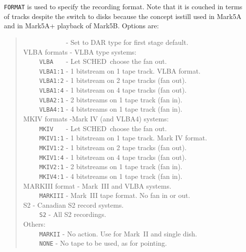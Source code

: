 \documentclass{report}
\newcommand{\schedb}{{\sc SCHED~}}
\begin{document}
{\tt FORMAT} is used to specify the recording format. Note that it is couched
in terms of tracks despite the switch to disks because the concept isstill
used in Mark5A and in Mark5A+ playback of Mark5B.  Options are:
\begin{verse}

\noindent ~~~~ {\tt ~~~~~~~} - Set to DAR type for first stage default.\\
\noindent VLBA formats - VLBA type systems:  \\
\noindent ~~~~ {\tt VLBA~~~} - Let \schedb choose the fan out. \\
\noindent ~~~~ {\tt VLBA1:1} - 1 bitstream on 1 tape track. VLBA format.  \\
\noindent ~~~~ {\tt VLBA1:2} - 1 bitstream on 2 tape tracks (fan out).    \\
\noindent ~~~~ {\tt VLBA1:4} - 1 bitstream on 4 tape tracks (fan out).    \\
\noindent ~~~~ {\tt VLBA2:1} - 2 bitstreams on 1 tape track (fan in).     \\
\noindent ~~~~ {\tt VLBA4:1} - 4 bitstreams on 1 tape track (fan in).     \\
\noindent MKIV formats -Mark IV (and VLBA4) systems:  \\
\noindent ~~~~ {\tt MKIV~~~} - Let \schedb choose the fan out. \\
\noindent ~~~~ {\tt MKIV1:1} - 1 bitstream on 1 tape track. Mark IV format.  \\
\noindent ~~~~ {\tt MKIV1:2} - 1 bitstream on 2 tape tracks (fan out).    \\
\noindent ~~~~ {\tt MKIV1:4} - 1 bitstream on 4 tape tracks (fan out).    \\
\noindent ~~~~ {\tt MKIV2:1} - 2 bitstreams on 1 tape track (fan in).     \\
\noindent ~~~~ {\tt MKIV4:1} - 4 bitstreams on 1 tape track (fan in).     \\
\noindent MARKIII format - Mark~III and VLBA systems. \\
\noindent ~~~~ {\tt MARKIII} - Mark~III tape format. No fan in or out.    \\
\noindent S2 - Canadian S2 record systems. \\
\noindent ~~~~ {\tt S2} - All S2 recordings. \\
\noindent Others:  \\
\noindent ~~~~ {\tt MARKII}  - No action. Use for Mark~II and single dish.\\
\noindent ~~~~ {\tt NONE}    - No tape to be used, as for pointing.       \\
\end{verse}
\end{document}
